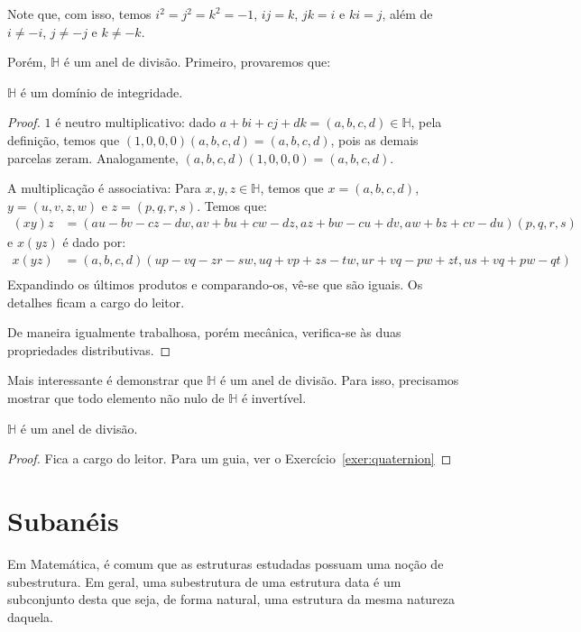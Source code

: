 Note que, com isso, temos $i^2=j^2=k^2=-1$, $ij=k$, $jk=i$ e $ki=j$, além de $i\neq -i$, $j\neq -j$ e $k\neq -k$.

Porém, $\mathbb H$ é um anel de divisão. Primeiro, provaremos que:

\begin{prop}
    $\mathbb H$ é um domínio de integridade.
\end{prop}
\begin{proof}
    $1$ é neutro multiplicativo: dado $a+bi+cj+dk=(a, b, c, d)\in \mathbb H$, pela definição, temos que $(1, 0, 0, 0)(a, b, c, d)=(a, b, c, d)$, pois as demais parcelas zeram. Analogamente, $(a, b, c, d)(1, 0, 0, 0)=(a, b, c, d)$.
    
    A multiplicação é associativa:
    Para $x, y, z \in \mathbb H$, temos que $x=(a, b, c, d)$, $y=(u, v, z, w)$ e $z=(p, q, r, s)$. Temos que:
    \begin{align*}
        (xy)z &=(au-bv-cz-dw, av+bu+cw-dz, az+bw-cu+dv, aw+bz+cv-du)(p,q,r,s)
    \end{align*}
    e $x(yz)$ é dado por:
    \begin{align*}
    x(yz) &=(a, b, c, d)(up-vq-zr-sw, uq+vp+zs-tw, ur+vq-pw+zt, us+vq+pw-qt)\\
    \end{align*}
    Expandindo os últimos produtos e comparando-os, vê-se que são iguais. Os detalhes ficam a cargo do leitor.

    De maneira igualmente trabalhosa, porém mecânica, verifica-se às duas propriedades distributivas.
\end{proof}

Mais interessante é demonstrar que $\mathbb H$ é um anel de divisão. Para isso, precisamos mostrar que todo elemento não nulo de $\mathbb H$ é invertível.

\begin{prop}
    $\mathbb H$ é um anel de divisão.
\end{prop}
\begin{proof}
    Fica a cargo do leitor. Para um guia, ver o Exercício~\ref{exer:quaternion}
\end{proof}
\section{Subanéis}
Em Matemática, é comum que as estruturas estudadas possuam uma noção de subestrutura.
Em geral, uma subestrutura de uma estrutura data é um subconjunto desta que seja, de forma natural, uma estrutura da mesma natureza daquela.

